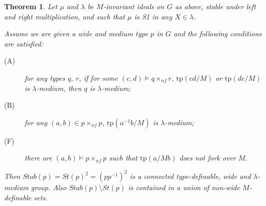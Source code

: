 \documentclass[12pt]{article}
\newtheorem{thm}{Theorem}[section]
\theoremstyle{definition}
\theoremstyle{mystyle}
\theoremstyle{remark}
\newcommand{\tp}{\mathrm{tp}}
\newcommand{\nf}{\times_{nf}}
\begin{document}
\begin{thm}\label{th_stabilizer}
Let $\mu$ and $\lambda$ be $M$-invariant ideals on $G$ as above,
stable under left and right multiplication, and such that $\mu$ is
S1 in any $X\in \lambda$.

Assume we are given a wide and medium type $p$ in $G$ and the following conditions are satisfied:
\begin{description}
\item[(A)] for any types $q$, $r$, if for some $(c,d)\models q \nf
r$, $\tp(cd/M)$ or $\tp(dc/M)$ is $\lambda$-medium, then $q$ is
$\lambda$-medium; \item[(B)] for any $(a,b)\in p \nf p$,
$\tp(a^{-1}b/M)$ is $\lambda$-medium; \item[(F)] there are
$(a,b)\models p \nf p$ such that $\tp(a/Mb)$ does not fork over
$M$.
\end{description}
Then $Stab(p)=St(p)^2 = (pp^{-1})^2$ is a connected
type-definable, wide and $\lambda$-medium group. Also
$Stab(p)\setminus St(p)$ is contained in a union of non-wide
$M$-definable sets.
\end{thm}
\end{document}
